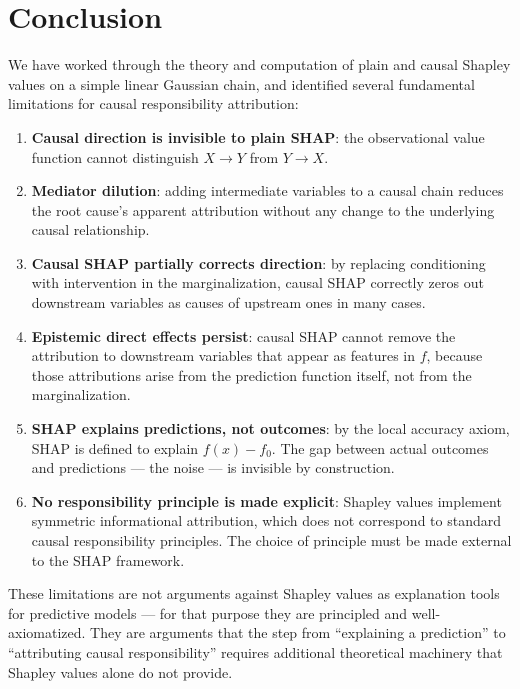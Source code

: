 \documentclass[12pt]{article}
\begin{document}
\section{Conclusion}

We have worked through the theory and computation of plain and causal Shapley values on a
simple linear Gaussian chain, and identified several fundamental limitations for causal
responsibility attribution:

\begin{enumerate}
\item \textbf{Causal direction is invisible to plain SHAP}: the observational value function
      cannot distinguish $X \to Y$ from $Y \to X$.
\item \textbf{Mediator dilution}: adding intermediate variables to a causal chain reduces
      the root cause's apparent attribution without any change to the underlying causal
      relationship.
\item \textbf{Causal SHAP partially corrects direction}: by replacing conditioning with
      intervention in the marginalization, causal SHAP correctly zeros out downstream
      variables as causes of upstream ones in many cases.
\item \textbf{Epistemic direct effects persist}: causal SHAP cannot remove the attribution
      to downstream variables that appear as features in $f$, because those attributions
      arise from the prediction function itself, not from the marginalization.
\item \textbf{SHAP explains predictions, not outcomes}: by the local accuracy axiom, SHAP
      is defined to explain $f(x) - f_0$. The gap between actual outcomes and predictions
      --- the noise --- is invisible by construction.
\item \textbf{No responsibility principle is made explicit}: Shapley values implement
      symmetric informational attribution, which does not correspond to standard causal
      responsibility principles. The choice of principle must be made external to the SHAP
      framework.
\end{enumerate}

These limitations are not arguments against Shapley values as explanation tools for
predictive models --- for that purpose they are principled and well-axiomatized. They are
arguments that the step from ``explaining a prediction'' to ``attributing causal
responsibility'' requires additional theoretical machinery that Shapley values alone do not
provide.
\end{document}

